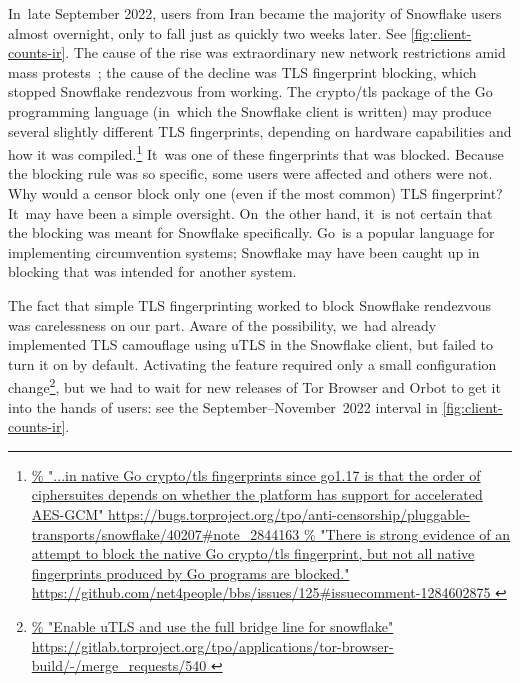 \documentclass[letterpaper,twocolumn]{article}
\newlength{\urlfootnotesize}
\newcommand{\urlfootnote}[1]{\footnote{
\raggedright\hangindent\footnotemargin%
\fontsize{\urlfootnotesize}{\urlfootnotesize}\selectfont%
\url{#1}
}}
\begin{document}
In~late September 2022,
users from Iran became the majority of Snowflake users almost overnight,
only to fall just as quickly two weeks later.
See \autoref{fig:client-counts-ir}.
The cause of the rise was
extraordinary new network restrictions amid mass protests~\cite{ooni-2022-iran-blocks-social-media-mahsa-amini-protests};
the cause of the decline was TLS fingerprint blocking,
which stopped Snowflake rendezvous from working.
The crypto/tls package of the Go programming language
(in~which the Snowflake client is written)
may produce several slightly different TLS fingerprints,
depending on hardware capabilities and how it was compiled.\urlfootnote{
https://bugs.torproject.org/tpo/anti-censorship/pluggable-transports/snowflake/40207\#note_2844163
}
It~was one of these fingerprints that was blocked.
Because the blocking rule was so specific,
some users were affected and others were not.
Why would a censor block only one (even if the most common)
TLS fingerprint?
It~may have been a simple oversight.
On~the other hand, it~is not certain that the blocking
was meant for Snowflake specifically.
Go~is a popular language for implementing circumvention systems;
Snowflake may have been caught up in blocking that was intended for another system.

The fact that simple TLS fingerprinting worked to block Snowflake rendezvous
was carelessness on our part.
Aware of the possibility,
we~had already implemented TLS camouflage using uTLS
in the Snowflake client,
but failed to turn it on by default.
Activating the feature required only a small configuration change\urlfootnote{
https://gitlab.torproject.org/tpo/applications/tor-browser-build/-/merge_requests/540
},
but we had to wait for new releases of Tor Browser and Orbot
to get it into the hands of users:
see the September--November~2022 interval in \autoref{fig:client-counts-ir}.
\end{document}
